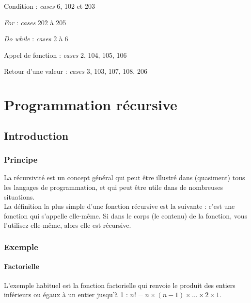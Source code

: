 \documentclass[a4paper,10pt]{book} %
\begin{document}
Condition : \textit{cases} 6, 102 et 203

\textit{For} : \textit{cases} 202 à 205

\textit{Do while} : \textit{cases} 2 à 6

Appel de fonction : \textit{cases} 2, 104, 105, 106

Retour d'une valeur : \textit{cases} 3, 103, 107, 108, 206







\chapter{Programmation récursive}
\section{Introduction}
\subsection{Principe}
La récursivité est un concept général qui peut être illustré dans (quasiment) tous les langages de programmation, et qui peut être utile dans de nombreuses situations.\\

La définition la plus simple d'une fonction récursive est la suivante : c'est une fonction qui s'appelle elle-même. Si dans le corps (le contenu) de la fonction, vous l'utilisez elle-même, alors elle est récursive.

\subsection{Exemple}
\subsubsection{Factorielle}
L'exemple habituel est la fonction factorielle qui renvoie le produit des entiers inférieurs ou égaux à un entier jusqu'à 1 :
$n! = n \times (n-1) \times \dots \times 2 \times 1$.
\end{document}
